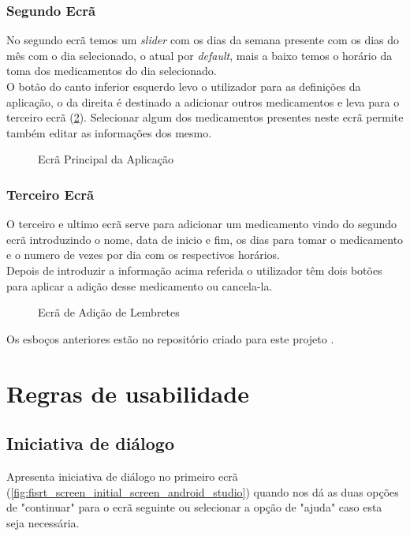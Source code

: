 \documentclass[a4paper]{article}
\begin{document}
\pagebreak

\subsubsection{Segundo Ecrã}
No segundo ecrã temos um \textit{slider} com os dias da semana presente com os dias do mês com o dia selecionado, o atual por \textit{default}, mais a baixo temos o horário da toma dos medicamentos do dia selecionado.\\
O botão do canto inferior esquerdo levo o utilizador para as definições da aplicação, o da direita é destinado a adicionar outros medicamentos e leva para o terceiro ecrã (\ref{fig:third_screen_initial_screen_android_studio}).
Selecionar algum dos medicamentos presentes neste ecrã permite também editar as informações dos mesmo.
\begin{figure}[H]
    \centering
    \caption{Ecrã Principal da Aplicação}
    \label{fig:second_screen_initial_screen_android_studio}
\end{figure}

\pagebreak

\subsubsection{Terceiro Ecrã}
O terceiro e ultimo ecrã serve para adicionar um medicamento vindo do segundo ecrã introduzindo o nome, data de inicio e fim, os dias para tomar o medicamento e o numero de vezes por dia com os respectivos horários.\\
Depois de introduzir a informação acima referida o utilizador têm dois botões para aplicar a adição desse medicamento ou cancela-la.

\begin{figure}[H]
    \centering
    \caption{Ecrã de Adição de Lembretes}
    \label{fig:third_screen_initial_screen_android_studio}
\end{figure}

Os esboços anteriores estão no repositório criado para este projeto \cite{easymed}.

\newpage

\section{Regras de usabilidade}\label{section:usability_rules}
\subsection{Iniciativa de diálogo}
Apresenta iniciativa de diálogo no primeiro ecrã (\ref{fig:fisrt_screen_initial_screen_android_studio}) quando nos dá as duas opções de "continuar" para o ecrã seguinte ou selecionar a opção de "ajuda" caso esta seja necessária.
\end{document}
